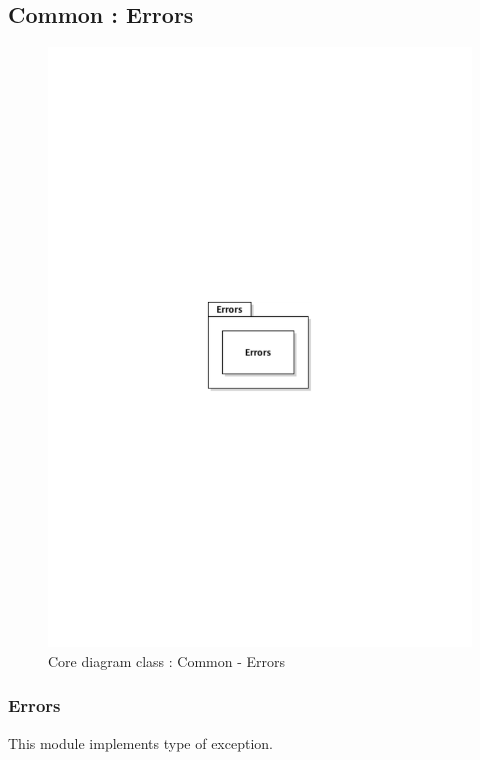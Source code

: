 	\subsection{Common :  Errors}
		\begin{figure}[ht]
			\begin{center}
				\includegraphics[width=\textwidth,  trim=2cm 12cm 2cm 12cm]{UML_figure/DC/core/common/DC_Errors.pdf}
				\caption{Core diagram class : Common - Errors}
			\end{center}
		\end{figure}
		\subsubsection{Errors}
			This module implements type of exception.
\newpage
